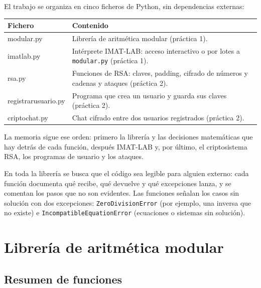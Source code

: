 \documentclass[11pt,a4paper]{article}
\renewcommand{\ttfamily}{\fontencoding{OT1}\fontfamily{cmtt}\selectfont}
\newcommand{\code}[1]{\texttt{#1}}
\begin{document}
El trabajo se organiza en cinco ficheros de Python, sin dependencias externas:

\begin{center}
\begin{tabularx}{\linewidth}{@{}>{\ttfamily}l X@{}}
\toprule
\normalfont\textbf{Fichero} & \textbf{Contenido} \\
\midrule
modular.py & Librería de aritmética modular (práctica 1). \\
imatlab.py & Intérprete IMAT-LAB: acceso interactivo o por lotes a \code{modular.py} (práctica 1). \\
rsa.py & Funciones de RSA: claves, padding, cifrado de números y cadenas y ataques (práctica 2). \\
registrarusuario.py & Programa que crea un usuario y guarda sus claves (práctica 2). \\
criptochat.py & Chat cifrado entre dos usuarios registrados (práctica 2). \\
\bottomrule
\end{tabularx}
\end{center}

La memoria sigue ese orden: primero la librería y las decisiones matemáticas que hay detrás de cada función, después IMAT-LAB y, por último, el criptosistema RSA, los programas de usuario y los ataques.

En toda la librería se busca que el código sea legible para alguien externo: cada función documenta qué recibe, qué devuelve y qué excepciones lanza, y se comentan los pasos que no son evidentes. Las funciones señalan los casos sin solución con dos excepciones: \code{ZeroDivisionError} (por ejemplo, una inversa que no existe) e \code{IncompatibleEquationError} (ecuaciones o sistemas sin solución).

\section{Librería de aritmética modular}

\subsection{Resumen de funciones}
\end{document}
